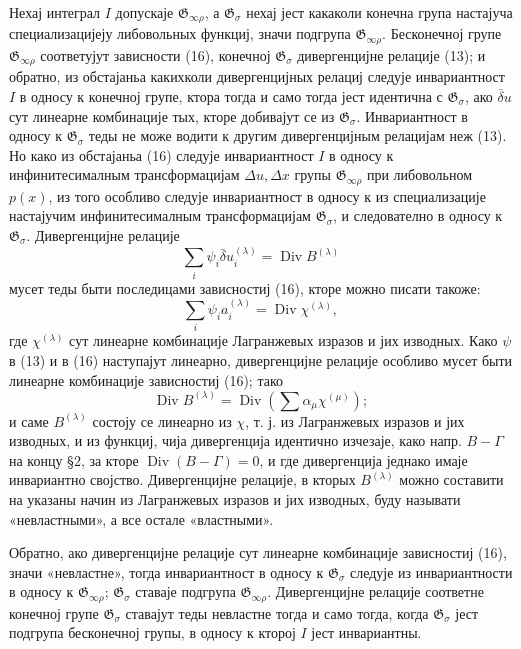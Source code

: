 ﻿\documentclass[11pt]{article}
\providecommand{\G}{\mathfrak G}
\providecommand{\D}{\Delta}
\DeclareMathOperator{\Div}{Div}
\providecommand{\bd}{\bar{\delta}}
\begin{document}
Нехај интеграл \(I\) допускаје \(\G_{\infty\rho}\), а \(\G_\sigma\) нехај јест какаколи конечна група настајуча специализацијеју либовольных функциј, значи подгрупа \(\G_{\infty\rho}\). Бесконечној групе \(\G_{\infty\rho}\) соответујут зависности (16), конечној \(\G_\sigma\) дивергенцијне релације (13); и обратно, из обстајаньа какихколи дивергенцијных релациј следује инвариантност \(I\) в односу к конечној групе, ктора тогда и само тогда јест идентична с \(\G_\sigma\), ако \(\bd u\) сут линеарне комбинације тых, кторе добивајут се из \(\G_\sigma\). Инвариантност в односу к \(\G_\sigma\) теды не може водити к другим дивергенцијным релацијам неж (13). Но како из обстајаньа (16) следује инвариантност \(I\) в односу к инфинитесималным трансформацијам \(\D u,\D x\) групы \(\G_{\infty\rho}\) при либовольном \(p(x)\), из того особливо следује инвариантност в односу к из специализације настајучим инфинитесималным трансформацијам \(\G_\sigma\), и следователно в односу к \(\G_\sigma\). Дивергенцијне релације
\[
\sum_i\psi_i\bd u_i^{(\lambda)}=\Div B^{(\lambda)}
\]
мусет теды быти последицами зависностиј (16), кторе можно писати такоже:
\[
\sum_i\psi_i a_i^{(\lambda)}=\Div\chi^{(\lambda)},
\]
где \(\chi^{(\lambda)}\) сут линеарне комбинације Лагранжевых изразов и јих изводных. Како \(\psi\) в (13) и в (16) наступајут линеарно, дивергенцијне релације особливо мусет быти линеарне комбинације зависностиј (16); тако
\[
\Div B^{(\lambda)}=\Div\left(\sum \alpha_\mu\chi^{(\mu)}\right);
\]
и саме \(B^{(\lambda)}\) состоју се линеарно из \(\chi\), т. ј. из Лагранжевых изразов и јих изводных, и из функциј, чија дивергенција идентично изчезаје, како напр. \(B-\Gamma\) на концу \S{}2, за кторе \(\Div(B-\Gamma)=0\), и где дивергенција једнако имаје инвариантно својство. Дивергенцијне релације, в кторых \(B^{(\lambda)}\) можно составити на указаны начин из Лагранжевых изразов и јих изводных, буду называти «невластными», а все остале «властными».

Обратно, ако дивергенцијне релације сут линеарне комбинације зависностиј (16), значи «невластне», тогда инвариантност в односу к \(\G_\sigma\) следује из инвариантности в односу к \(\G_{\infty\rho}\); \(\G_\sigma\) ставаје подгрупа \(\G_{\infty\rho}\). Дивергенцијне релације соответне конечној групе \(\G_\sigma\) ставајут теды невластне тогда и само тогда, когда \(\G_\sigma\) јест подгрупа бесконечној групы, в односу к кторој \(I\) јест инвариантны.
\end{document}
